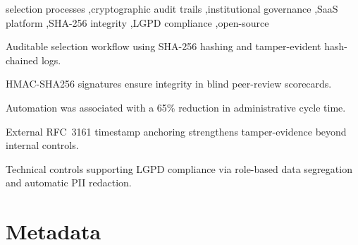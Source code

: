 \documentclass[preprint,12pt,a4paper]{elsarticle}
\begin{document}
\begin{frontmatter}
\begin{keyword}
selection processes \sep cryptographic audit trails \sep institutional governance \sep SaaS platform \sep SHA-256 integrity \sep LGPD compliance \sep open-source
\end{keyword}

\begin{highlights}
\item Auditable selection workflow using SHA-256 hashing and tamper-evident hash-chained logs.
\item HMAC-SHA256 signatures ensure integrity in blind peer-review scorecards.
\item Automation was associated with a 65\% reduction in administrative cycle time.
\item External RFC~3161 timestamp anchoring strengthens tamper-evidence beyond internal controls.
\item Technical controls supporting LGPD compliance via role-based data segregation and automatic PII redaction.
\end{highlights}

\end{frontmatter}


\section*{Metadata}
\end{document}
